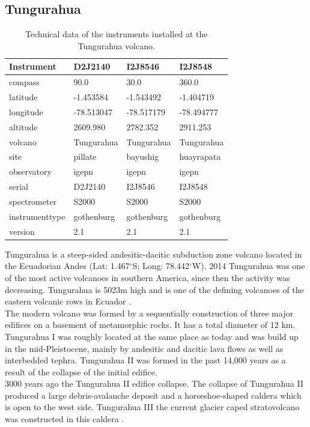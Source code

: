 \documentclass  [
  paper    = a4,
  BCOR     = 10mm,
  twoside,
  fontsize = 12pt,
  fleqn,
  toc      = bibnumbered,
  toc      = listofnumbered,
  numbers  = noendperiod,
  headings = normal,
  listof   = leveldown,
  version  = 3.03
]                                       {scrreprt}
\begin{document}
	\subsection*{Tungurahua \label{Tung}}
	\begin{table}
		\centering
		\begin{tabular}{|p{4cm}|p{3cm}|p{3cm}|p{3cm}|}
			Instrument	&D2J2140&I2J8546& I2J8548\\
			\toprule
			compass&90.0	&	30.0	&	360.0	\\
			latitude&-1.453584	&	-1.543492	&-1.404719	\\
			longitude&-78.513047	&-78.517179	&	-78.494777	\\
			altitude&2609.980	&	2782.352	&	2911.253	\\
			volcano&Tungurahua	&Tungurahua	&	Tungurahua	\\
			site&pillate	&	bayushig	&	huayrapata	\\
			observatory&igepn	&	igepn	&igepn	\\
			serial&D2J2140	&	I2J8546	&	I2J8548	\\
			spectrometer&S2000	&	S2000	&S2000	\\
			instrumenttype&gothenburg	&gothenburg	&gothenburg	\\
			version&2.1	&2.1	&	2.1	\\
			\bottomrule
		\end{tabular}
		\caption{Technical data of the instruments installed at the Tungurahua volcano.}
		\label{tab:TInstruments}
	\end{table}
	Tungurahua is a steep-sided andesitic-dacitic subduction zone volcano located in the Ecuadorian Andes (Lat: 1.467$^{\circ}$S; Long: 78.442$^{\circ}$W). 2014 Tungurahua was one of the most active volcanoes in southern America, since then the activity was decreasing. Tungurahua is 5023m high and is one of the defining volcanoes of the eastern volcanic rows in Ecuador \citep{hall1999tungurahua}.
	\\
	The modern volcano was formed by a sequentially construction of three major edifices on a basement of metamorphic rocks. It has a total diameter of 12 km. Tungurahua I was roughly located at the same place as today and was build up in the mid-Pleistocene, mainly by andesitic and dacitic lava flows as well as interbedded tephra. Tungurahua II was formed in the past 14,000 years as a result of the collapse of the initial edifice.\\
	3000 years ago the Tungurahua II edifice collapse. The collapse of Tungurahua II produced a large debris-avalanche deposit and a horseshoe-shaped caldera which is open to the west side. Tungurahua III the current glacier caped stratovolcano was constructed in this caldera \citep{GlobalVolcanismProgram}.\\
\end{document}
